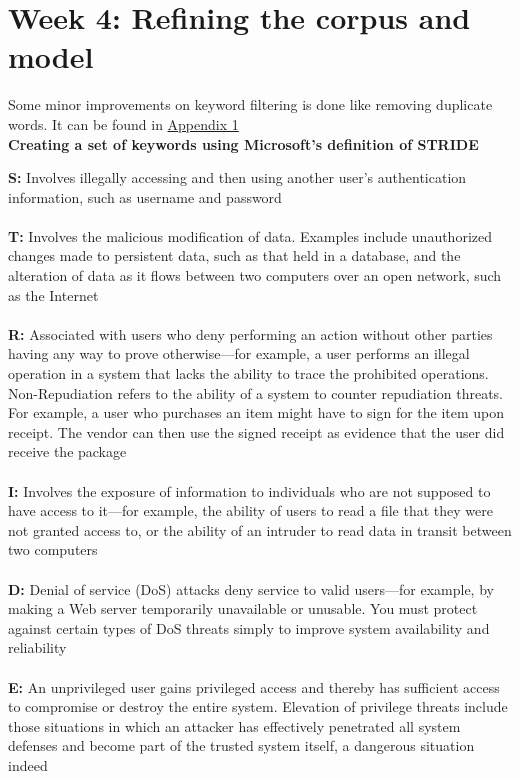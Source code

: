 \section*{Week 4: Refining the corpus and model}

Some minor improvements on keyword filtering is done like removing duplicate words. It can be found in \hyperref[subsec:appendix1]{Appendix 1}\\

\textbf{Creating a set of keywords using Microsoft's definition of STRIDE}

\textbf{S:} Involves illegally accessing and then using another user's authentication information, such as username and password \\\\
\textbf{T:} Involves the malicious modification of data. Examples include unauthorized changes made to persistent data, such as that held in a database, and the alteration of data as it flows between two computers over an open network, such as the Internet \\\\
\textbf{R:} Associated with users who deny performing an action without other parties having any way to prove otherwise—for example, a user performs an illegal operation in a system that lacks the ability to trace the prohibited operations. Non-Repudiation refers to the ability of a system to counter repudiation threats. For example, a user who purchases an item might have to sign for the item upon receipt. The vendor can then use the signed receipt as evidence that the user did receive the package \\\\
\textbf{I:} Involves the exposure of information to individuals who are not supposed to have access to it—for example, the ability of users to read a file that they were not granted access to, or the ability of an intruder to read data in transit between two computers \\\\
\textbf{D:} Denial of service (DoS) attacks deny service to valid users—for example, by making a Web server temporarily unavailable or unusable. You must protect against certain types of DoS threats simply to improve system availability and reliability \\\\
\textbf{E:} An unprivileged user gains privileged access and thereby has sufficient access to compromise or destroy the entire system. Elevation of privilege threats include those situations in which an attacker has effectively penetrated all system defenses and become part of the trusted system itself, a dangerous situation indeed \\\\

